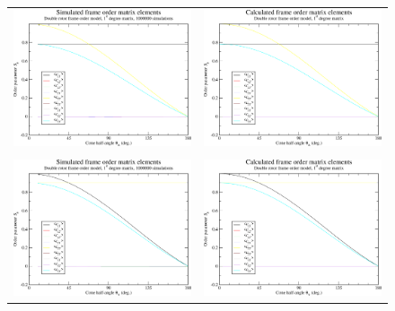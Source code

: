 \begin{figure}
\centering
  \begin{tabular}{@{}cc@{}}
    \includegraphics[width=.5\textwidth]{images/frame_order_matrix/Sij_double_rotor_in_frame_theta_x_ens1000000.eps} &
    \includegraphics[width=.5\textwidth]{images/frame_order_matrix/Sij_double_rotor_in_frame_theta_x_calc.eps} \\
    \\[-5pt]
    \includegraphics[width=.5\textwidth]{images/frame_order_matrix/Sij_double_rotor_in_frame_theta_y_ens1000000.eps} &
    \includegraphics[width=.5\textwidth]{images/frame_order_matrix/Sij_double_rotor_in_frame_theta_y_calc.eps} \\

\end{tabular}
\end{figure}
